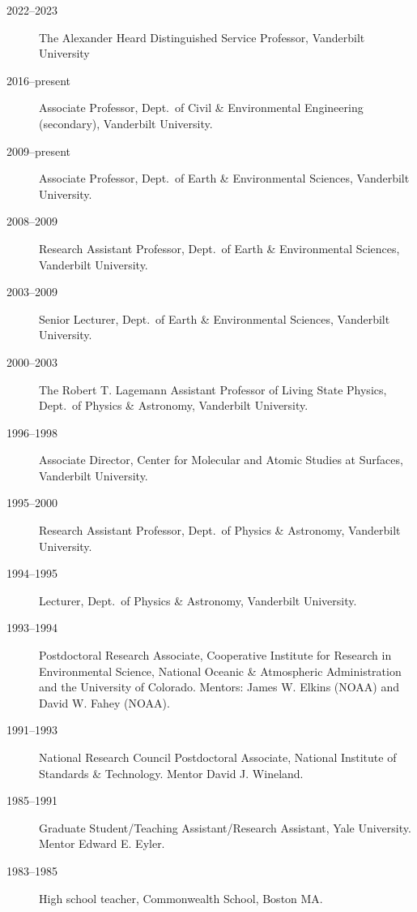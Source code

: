 \begin{description}
\item[2022--2023] The Alexander Heard Distinguished Service Professor,
  Vanderbilt University
\item[2016--present] Associate Professor, Dept.\ of Civil \& Environmental Engineering (secondary), Vanderbilt University.
\item[2009--present] Associate Professor, Dept.\ of Earth \& Environmental Sciences, Vanderbilt University.
\item[2008--2009] Research Assistant Professor, Dept.\ of Earth \& Environmental Sciences, Vanderbilt University.
\item[2003--2009] Senior Lecturer, Dept.\ of Earth \& Environmental Sciences, Vanderbilt University.
\item[2000--2003] The Robert T. Lagemann Assistant Professor of Living State Physics, Dept.\ of Physics \& Astronomy, Vanderbilt University.
\item[1996--1998] Associate Director, Center for Molecular and Atomic Studies at Surfaces, Vanderbilt University.
\item[1995--2000] Research Assistant Professor, Dept.\ of Physics \& Astronomy, Vanderbilt University.
\item[1994--1995] Lecturer, Dept.\ of Physics \& Astronomy, Vanderbilt University.
\item[1993--1994] Postdoctoral Research Associate, Cooperative Institute for Research in Environmental Science, National Oceanic \& Atmospheric Administration and the University of Colorado. Mentors: James W. Elkins (NOAA) and David W. Fahey (NOAA).
\item[1991--1993] National Research Council Postdoctoral Associate, National Institute of Standards \& Technology. Mentor David J. Wineland.
\item[1985--1991] Graduate Student/Teaching Assistant/Research Assistant, Yale University. Mentor Edward E. Eyler.
\item[1983--1985] High school teacher, Commonwealth School, Boston MA.
\end{description}
